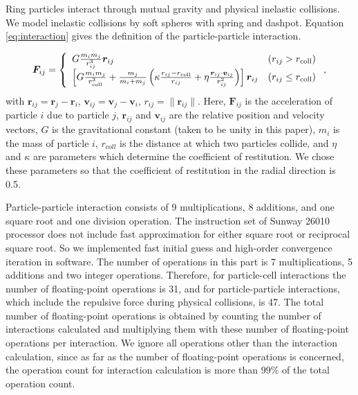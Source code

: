 \documentclass[oribibl]{llncs}
\begin{document}
Ring particles interact through mutual gravity and physical inelastic
collisions. We model inelastic collisions by soft spheres with spring
and dashpot. Equation \ref{eq:interaction} gives the definition of the
particle-particle interaction.

\begin{eqnarray}
  \bm F_{ij} = \left \{
  \begin{array}{ll}
     G \frac{m_i m_j}{r_{ij}^3} \bm r_{ij} & \left(r_{ij} > r_{\rm coll} \right) \\
     \left[  G \frac{m_i m_j} {r_{\rm coll}^3} + \frac{m_j}{m_i + m_j} \left( \kappa \frac{ r_{ij} - r_{\rm coll}}{r_{ij}} + \eta \frac{\bm r_{ij} \cdot \bm v_{ij}}{r_{ij}^2} \right) \right] \bm r_{ij} & \left( r_{ij} \le r_{\rm coll} \right)
  \end{array}
  \right.
\label{eq:interaction} 
,
\end{eqnarray}
with $\bm r_{ij} = \bm r_j - \bm r_i$, $\bm v_{ij} = \bm v_j - \bm
v_i$, $r_{ij} = \| \bm r_{ij} \|$. Here, $\bm F_{ij}$ is the
acceleration of particle $i$ due to particle $j$, ${\mathbf r_{ij}}$ and
$\bm v_{ij}$ are the relative position and velocity vectors, $G$
is the gravitational constant (taken to be unity in this paper), $m_i$
is the mass of particle $i$, $r_{coll}$ is the distance at which two
particles collide, and $\eta$ and $\kappa$ are parameters which
determine the coefficient of restitution. We chose these parameters so
that the coefficient of restitution in the radial direction is 0.5.

Particle-particle interaction consists of 9 multiplications, 8
additions, and one square root and one division
operation. The instruction set of Sunway 26010 processor does not include
fast approximation for either square root or reciprocal square
root. So we implemented fast initial guess and high-order convergence
iteration in software. The number of operations in this part is 7
multiplications, 5 additions and two integer operations. Therefore,
for particle-cell interactions the number of floating-point operations
is 31, and for particle-particle interactions, which include the
repulsive force during physical collisions, is 47. The total number of
floating-point operations is obtained by counting the number of
interactions calculated and multiplying them with these number of
floating-point operations per interaction. We ignore all operations
other than the interaction calculation, since as far as the number of
floating-point operations is concerned, the operation count for interaction
calculation is more than 99\% of the total operation count.
\end{document}
